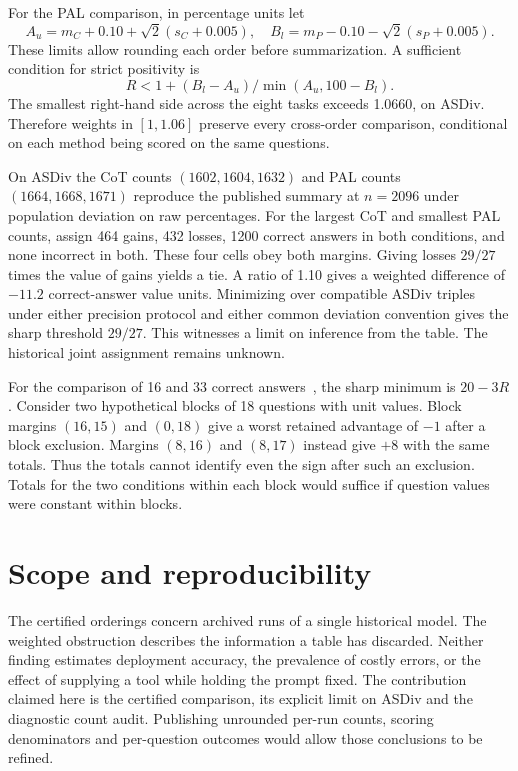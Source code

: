 \documentclass[10pt]{article}
\begin{document}
For the PAL comparison, in percentage units let
\[
 A_u=m_C+0.10+\sqrt{2}(s_C+0.005),\quad
 B_l=m_P-0.10-\sqrt{2}(s_P+0.005).
\]
These limits allow rounding each order before summarization. A sufficient condition for strict positivity is
\[
 R<1+(B_l-A_u)/\min(A_u,100-B_l).
\]
The smallest right-hand side across the eight tasks exceeds 1.0660, on ASDiv. Therefore weights in $[1,1.06]$ preserve every cross-order comparison, conditional on each method being scored on the same questions.

On ASDiv the CoT counts $(1602,1604,1632)$ and PAL counts $(1664,1668,1671)$ reproduce the published summary at $n=2096$ under population deviation on raw percentages. For the largest CoT and smallest PAL counts, assign 464 gains, 432 losses, 1200 correct answers in both conditions, and none incorrect in both. These four cells obey both margins. Giving losses $29/27$ times the value of gains yields a tie. A ratio of 1.10 gives a weighted difference of $-11.2$ correct-answer value units. Minimizing over compatible ASDiv triples under either precision protocol and either common deviation convention gives the sharp threshold $29/27$. This witnesses a limit on inference from the table. The historical joint assignment remains unknown.

For the comparison of 16 and 33 correct answers~\cite{ficsor}, the sharp minimum is $20-3R$. Consider two hypothetical blocks of 18 questions with unit values. Block margins $(16,15)$ and $(0,18)$ give a worst retained advantage of $-1$ after a block exclusion. Margins $(8,16)$ and $(8,17)$ instead give $+8$ with the same totals. Thus the totals cannot identify even the sign after such an exclusion. Totals for the two conditions within each block would suffice if question values were constant within blocks.

\section{Scope and reproducibility}
The certified orderings concern archived runs of a single historical model. The weighted obstruction describes the information a table has discarded. Neither finding estimates deployment accuracy, the prevalence of costly errors, or the effect of supplying a tool while holding the prompt fixed. The contribution claimed here is the certified comparison, its explicit limit on ASDiv and the diagnostic count audit. Publishing unrounded per-run counts, scoring denominators and per-question outcomes would allow those conclusions to be refined.
\end{document}
